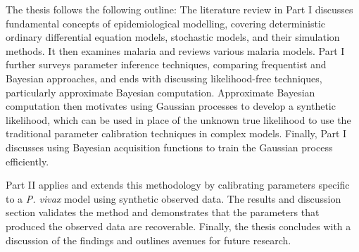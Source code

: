 The thesis follows the following outline: The literature review in Part I
discusses fundamental concepts of epidemiological modelling, covering
deterministic ordinary differential equation models, stochastic models, and
their simulation methods. It then examines malaria and reviews various malaria
models. Part I further surveys parameter inference techniques, comparing
frequentist and Bayesian approaches, and ends with discussing likelihood-free
techniques, particularly approximate Bayesian computation.
Approximate Bayesian computation then motivates using Gaussian processes to
develop a synthetic likelihood, which can be used in place of the unknown true
likelihood to use the traditional parameter calibration techniques in complex
models. Finally, Part I discusses using Bayesian acquisition functions to train
the Gaussian process efficiently.

Part II applies and extends this methodology by calibrating parameters specific
to a \textit{P. vivax} model using synthetic observed data. The results and 
discussion
section validates the method and demonstrates that the parameters that produced
the observed data are recoverable. Finally, the thesis concludes with a
discussion of the findings and outlines avenues for future research.